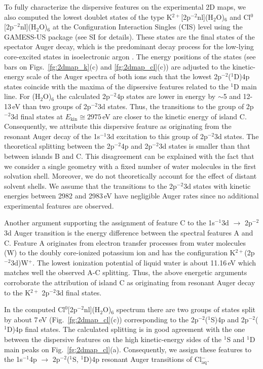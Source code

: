 To fully characterize the dispersive features on the experimental 2D maps, we also computed the lowest doublet states of the type K$^{2+}$[2p$^{-2}$nl](H$_2$O)$_6$ and Cl$^{0}$[2p$^{-2}$nl](H$_2$O)$_6$ at the Configuration Interaction Singles (CIS) level using the GAMESS-US package \citep{GUGA_PhysScr_21,GUGA_JCP_70,GUS} (see SI for details). These states are the final states of the spectator Auger decay, which is the predominant decay process for the low-lying core-excited states in isoelectronic argon \citep{ceolin15:022502}. The energy positions of the states (see bars on Figs.\ \ref{fg:2dmap_k}(c) and \ref{fg:2dmap_cl}(c)) are adjusted to the kinetic-energy scale of the Auger spectra of both ions such that the lowest 2p$^{-2}$($^1$D)4p states coincide with the maxima of the dipsersive features related to the $^1$D main line. For \ki(H$_2$O)$_6$ the calculated 2p$^{-2}$4p states are lower in energy by $\sim$5 and 12-13\,eV than two groups of 2p$^{-2}$3d states. Thus, the transitions to the group of 2p$^{-2}$3d final states at $E_{\text{kin}}\cong 2975$\,eV are closer to the kinetic energy of island C. Consequently, we attribute this dispersive feature as originating from the resonant Auger decay of the 1s$^{-1}$3d excitation to this group of 2p$^{-2}$3d states. The theoretical splitting between the 2p$^{-2}$4p and 2p$^{-2}$3d states is smaller than that between islands B and C. This disagreement can be explained with the fact that we consider a single geometry with a fixed number of water molecules in the first solvation shell. Moreover, we do not theoretically account for the effect of distant solvent shells. We assume that the transitions to the 2p$^{-2}$3d states with kinetic energies between 2982 and 2983\,eV have negligible Auger rates since no additional experimental features are observed.


Another argument supporting the assignment of feature C to the 1s$^{-1}$3d $\rightarrow$ 2p$^{-2}$3d Auger transition is the energy difference between the spectral features A and C. Feature A originates from electron transfer processes from water molecules (W) to the doubly core-ionized potassium ion and has the configuration K$^{2+}$(2p$^{-2}$3d)W$^{+}$. The lowest ionization potential of liquid water is about 11.16\,eV \cite{winter04:2625} which matches well the observed A-C splitting. Thus, the above energetic arguments corroborate the attribution of island C as originating from resonant Auger decay to the K$^{2+}$ 2p$^{-2}$3d final states.


In the computed Cl$^{0}$[2p$^{-2}$nl](H$_2$O)$_6$ spectrum there are two groups of states split by about 7\,eV (Fig.\ \ref{fg:2dmap_cl}(c)) corresponding to the 2p$^{-2}$($^1$S)4p and 2p$^{-2}$($^1$D)4p final states. The calculated splitting is in good agreement with the one between the dispersive features on the high kinetic-energy sides of the $^1$S and $^1$D main peaks on Fig.\ \ref{fg:2dmap_cl}(a). Consequently, we assign these features to the 1s$^{-1}$4p $\rightarrow$ 2p$^{-2}$($^1$S, $^1$D)4p resonant Auger transitions of Cl$^{-}_{\text{aq}}$.


